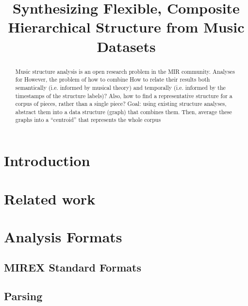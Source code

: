 \documentclass{article}
\title{Synthesizing Flexible, Composite Hierarchical Structure from Music Datasets}
\begin{document}
%
\maketitle
%


\begin{abstract}
Music structure analysis is an open research problem in the MIR community. Analyses for However, the problem of how to combine
How to relate their results both semantically (i.e. informed by musical theory) and temporally (i.e. informed by the timestamps of the structure labels)?
Also, how to find a representative structure for a corpus of pieces, rather than a single piece?
Goal: using existing structure analyses, abstract them into a data structure (graph) that combines them. Then, average these graphs into a “centroid” that represents the whole corpus

\end{abstract}
%
\section{Introduction}\label{sec:intro}


\section{Related work}\label{sec:related_work}

\section{Analysis Formats}\label{sec:formats}
\subsection{MIREX Standard Formats} \label{subsec:MIREX}
\subsection{Parsing} \label{subsec:parsing}
\end{document}
